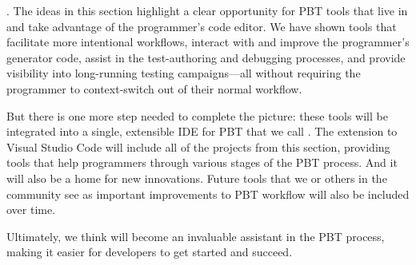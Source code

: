 

.
The ideas in this section highlight a clear opportunity for PBT tools that live
in and take advantage of the programmer's code editor. We have shown tools that
facilitate more intentional workflows, interact with and improve the
programmer's generator code, assist in the test-authoring and debugging
processes, and provide visibility into long-running testing campaigns---all
without requiring the programmer to context-switch out of their normal workflow.

But there is one more step needed to complete the picture: these tools will be
integrated into a single, extensible IDE for PBT that we call \tyche. The \tyche{}
extension to Visual Studio Code will include all of the projects from this
section, providing tools that help programmers through various stages of the PBT
process. And it will also be a home for new innovations. Future tools that we
or others in the community see as important improvements to PBT workflow will
also be included over time.

Ultimately, we think \tyche{} will become an invaluable assistant in the PBT
process, making it easier for developers to get started and succeed.
\iflater {} \fi



